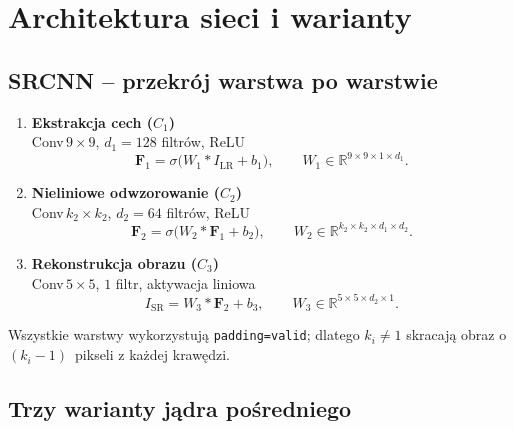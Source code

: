 \documentclass[11pt]{article}
\begin{document}


\section{Architektura sieci i warianty}
\label{sec:model}

\subsection{SRCNN – przekrój warstwa po warstwie}

\begin{enumerate}
  \item \textbf{Ekstrakcja cech (\(C_1\))}\\
        Conv$\,9\times9$, $d_1=128$ filtrów,\; ReLU  
        \[
          \mathbf F_1 = \sigma\!\bigl(W_1 * I_\mathrm{LR}+b_1\bigr),
        \qquad
          W_1\in\mathbb R^{9\times 9\times 1\times d_1}.
        \]
  \item \textbf{Nieliniowe odwzorowanie (\(C_2\))}\\
        Conv$\,k_2\times k_2$, $d_2=64$ filtrów,\; ReLU
        \[
          \mathbf F_2 = \sigma\!\bigl(W_2 * \mathbf F_1 + b_2\bigr),
          \qquad
          W_2\in\mathbb R^{k_2\times k_2\times d_1\times d_2}.
        \]
  \item \textbf{Rekonstrukcja obrazu (\(C_3\))}\\
        Conv$\,5\times5$, $1$ filtr, aktywacja liniowa
        \[
          I_\mathrm{SR}= W_3 * \mathbf F_2 + b_3,
          \qquad
          W_3\in\mathbb R^{5\times 5\times d_2\times 1}.
        \]
\end{enumerate}

Wszystkie warstwy wykorzystują \texttt{padding=valid};
dlatego \(k_i\neq1\) skracają obraz o \((k_i-1)\)~pikseli z każdej
krawędzi.  

\subsection{Trzy warianty jądra pośredniego}
\end{document}
